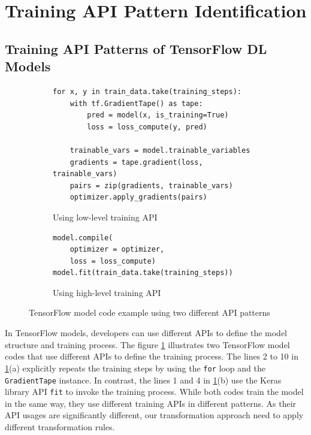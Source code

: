 \pagebreak
\section{Training API Pattern Identification}\label{sec:pattern}

\subsection{Training API Patterns of TensorFlow DL Models}

\begin{figure}[ht!]
\centering
  \begin{subfigure}[b]{\textwidth}
    \begin{lstlisting}[style=mpython]
for x, y in train_data.take(training_steps):
    with tf.GradientTape() as tape:
        pred = model(x, is_training=True)
        loss = loss_compute(y, pred)

    trainable_vars = model.trainable_variables
    gradients = tape.gradient(loss, trainable_vars)
    pairs = zip(gradients, trainable_vars)
    optimizer.apply_gradients(pairs) 
    \end{lstlisting}
    \caption{Using low-level training API}
  \end{subfigure}
  \hspace{5mm}
  \begin{subfigure}[b]{\textwidth}
    \begin{lstlisting}[style=mpython]
model.compile(
    optimizer = optimizer, 
    loss = loss_compute) 
model.fit(train_data.take(training_steps))
    \end{lstlisting} 
    \caption{Using high-level training API}
  \end{subfigure}

  \caption{TensorFlow model code example using two different API patterns}
  \label{fig:pattern:ex01}
\end{figure}

In TensorFlow models, developers can use different APIs to define the 
model structure and training process.
The figure \ref{fig:pattern:ex01} illustrates two TensorFlow model codes that
use different APIs to define the training process.
The lines 2 to 10 in \ref{fig:pattern:ex01}(a)  
explicitly repeats the training steps by using the {\tt for} loop
and the {\tt GradientTape} instance.
In contrast, the lines 1 and 4 in \ref{fig:pattern:ex01}(b)
use the Keras library API {\tt fit} to invoke the training process.
While both codes train the model in the same way, they use different training 
APIs in different patterns.
As their API usages are significantly different, our transformation approach
need to apply different transformation rules.

